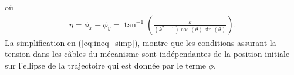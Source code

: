 où 
\begin{align}
\eta = \phi_x-\phi_y = \tan^{-1}\left(\frac{k}{(k^2-1)\cos(\theta)\sin(\theta)}\right).\label{chap1:eq:eta}
\end{align}
La simplification en (\ref{eq:ineq_simp}), montre que les conditions assurant la tension dans les câbles du mécanisme sont indépendantes de la position initiale sur l'ellipse de la trajectoire qui est donnée par le terme $\phi$.
